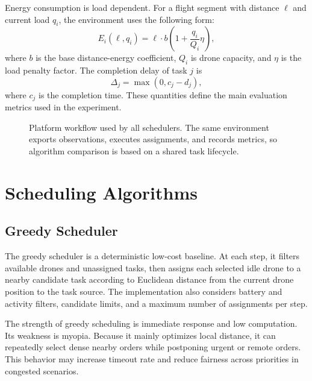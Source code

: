 \documentclass[sigconf,balance=false]{aamas}
\begin{document}
Energy consumption is load dependent. For a flight segment with distance $\ell$ and current load $q_i$, the environment uses the following form:
\begin{equation}
E_i(\ell,q_i)=\ell\cdot b\left(1+\frac{q_i}{Q_i}\eta\right),
\end{equation}
where $b$ is the base distance-energy coefficient, $Q_i$ is drone capacity, and $\eta$ is the load penalty factor. The completion delay of task $j$ is
\begin{equation}
\Delta_j=\max(0,c_j-d_j),
\end{equation}
where $c_j$ is the completion time. These quantities define the main evaluation metrics used in the experiment.

\begin{figure}[t]
\centering
{}
\caption{Platform workflow used by all schedulers. The same environment exports observations, executes assignments, and records metrics, so algorithm comparison is based on a shared task lifecycle.}
\label{fig:workflow}
\end{figure}

\section{Scheduling Algorithms}

\subsection{Greedy Scheduler}

The greedy scheduler is a deterministic low-cost baseline. At each step, it filters available drones and unassigned tasks, then assigns each selected idle drone to a nearby candidate task according to Euclidean distance from the current drone position to the task source. The implementation also considers battery and activity filters, candidate limits, and a maximum number of assignments per step.

The strength of greedy scheduling is immediate response and low computation. Its weakness is myopia. Because it mainly optimizes local distance, it can repeatedly select dense nearby orders while postponing urgent or remote orders. This behavior may increase timeout rate and reduce fairness across priorities in congested scenarios.
\end{document}
